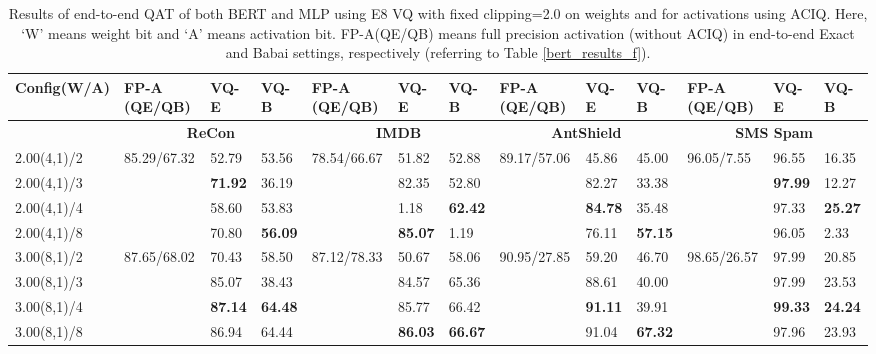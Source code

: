 \documentclass{article}
\theoremstyle{definition}
\theoremstyle{remark}
\begin{document}
\begin{table}[h]
\scriptsize
    \centering
        \caption{Results of end-to-end QAT of both BERT and MLP using E8 VQ with fixed clipping=2.0 on weights and for activations using ACIQ. Here, `W' means weight bit and `A' means activation bit. FP-A(QE/QB) means full precision activation (without ACIQ) in end-to-end Exact and Babai settings, respectively (referring to Table \ref{bert_results_f}).}
    \label{tab:aciqbert}
    \begin{tabular}{|p{1.4cm}|p{1.1cm}|p{0.7cm}|p{0.7cm}|p{1.1cm}|p{0.7cm}|p{0.7cm}|p{1.1cm}|p{0.7cm}|p{0.7cm}|p{1.1cm}|p{0.7cm}|p{0.7cm}|} \hline
        \textbf{Config(W/A)} & \textbf{FP-A (QE/QB)}&\textbf{VQ-E} & \textbf{VQ-B} & \textbf{FP-A (QE/QB)}& \textbf{VQ-E} & \textbf{VQ-B} &  \textbf{FP-A (QE/QB)} & \textbf{VQ-E} & \textbf{VQ-B} & \textbf{FP-A (QE/QB)} & \textbf{VQ-E} & \textbf{VQ-B}\\ \hline
        \rowcolor{black!20}
        & \multicolumn{3}{|c|}{\textbf{ReCon}} &  \multicolumn{3}{|c|}{\textbf{IMDB}} &  \multicolumn{3}{|c|}{\textbf{AntShield}} &  \multicolumn{3}{|c|}{\textbf{SMS Spam}}\\ \hline
        2.00(4,1)/2 & 85.29/67.32 & 52.79 & 53.56 & 78.54/66.67 & 51.82 & 52.88& 89.17/57.06 &45.86&45.00& 96.05/7.55& 96.55&16.35\\
        
         2.00(4,1)/3 &  & \textbf{71.92} & 36.19 & & 82.35 & 52.80& & 82.27&33.38& & \textbf{97.99}&12.27\\
         2.00(4,1)/4 & & 58.60 & 53.83 & & 1.18 & \textbf{62.42}& & \textbf{84.78}&35.48& & 97.33&\textbf{25.27}\\
         2.00(4,1)/8 &  &  70.80 & \textbf{56.09} & & \textbf{85.07} & 1.19& & 76.11&\textbf{57.15}& & 96.05&2.33\\ \hline
         
         3.00(8,1)/2 & 87.65/68.02  & 70.43 & 58.50 & 87.12/78.33& 50.67 & 58.06& 90.95/27.85& 59.20&46.70& 98.65/26.57& 97.99&20.85\\
         
         3.00(8,1)/3 &  & 85.07 & 38.43 & & 84.57 & 65.36& & 88.61&40.00& & 97.99&23.53\\
         
         3.00(8,1)/4 &  & \textbf{87.14} & \textbf{64.48} & & 85.77 & 66.42& & \textbf{91.11}&39.91& & \textbf{99.33}&\textbf{24.24}\\
         3.00(8,1)/8 &  & 86.94 & 64.44 & & \textbf{86.03} & \textbf{66.67}& & 91.04&\textbf{67.32}& & 97.96&23.93\\ \hline
    \end{tabular}

\end{table}
\end{document}
